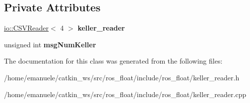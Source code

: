 \subsection*{Private Attributes}
\begin{DoxyCompactItemize}
\item 
\mbox{\label{classKeller__reader_a4fcf1b20e6a5fe8a262b12042ab433bd}} 
\hyperlink{classio_1_1CSVReader}{io\+::\+C\+S\+V\+Reader}$<$ 4 $>$ {\bfseries keller\+\_\+reader}
\item 
\mbox{\label{classKeller__reader_a09fb87959f1d7228d22ab26d6d858912}} 
unsigned int {\bfseries msg\+Num\+Keller}
\end{DoxyCompactItemize}


The documentation for this class was generated from the following files\+:\begin{DoxyCompactItemize}
\item 
/home/emanuele/catkin\+\_\+ws/src/ros\+\_\+float/include/ros\+\_\+float/keller\+\_\+reader.\+h\item 
/home/emanuele/catkin\+\_\+ws/src/ros\+\_\+float/include/ros\+\_\+float/keller\+\_\+reader.\+cpp\end{DoxyCompactItemize}
